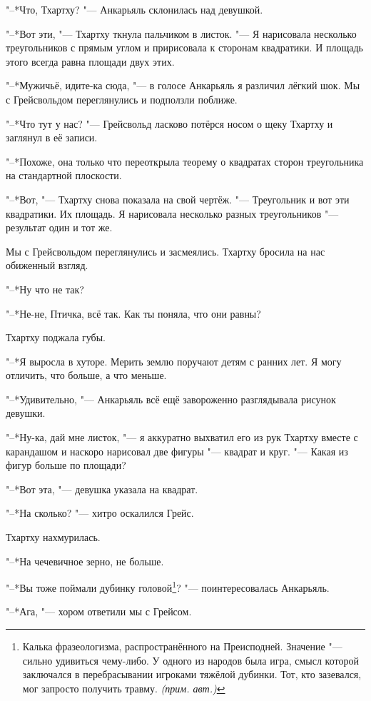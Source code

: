 \documentclass[a4paper,10pt,fleqn]{book}
\newcommand{\ldotst}{\so{...}\xspace}
\newcommand{\authornote}{\textit{(прим. авт.)}}
\begin{document}
"--*Что, Тхартху? "--- Анкарьяль склонилась над девушкой.

"--*Вот эти, "--- Тхартху ткнула пальчиком в листок.
"--- Я нарисовала несколько треугольников с\ldotst прямым углом и пририсовала к сторонам квадратики.
И площадь этого всегда равна площади двух этих.

"--*Мужичьё, идите-ка сюда, "--- в голосе Анкарьяль я различил лёгкий шок.
Мы с Грейсвольдом переглянулись и подползли поближе.

"--*Что тут у нас? "--- Грейсвольд ласково потёрся носом о щеку Тхартху и заглянул в её записи.

"--*Похоже, она только что переоткрыла теорему о квадратах сторон треугольника на стандартной плоскости.

"--*Вот, "--- Тхартху снова показала на свой чертёж.
"--- Треугольник и вот эти квадратики.
Их площадь.
Я нарисовала несколько разных треугольников "--- результат один и тот же.

Мы с Грейсвольдом переглянулись и засмеялись.
Тхартху бросила на нас обиженный взгляд.

"--*Ну что не так?

"--*Не-не, Птичка, всё так.
Как ты поняла, что они равны?

Тхартху поджала губы.

"--*Я выросла в хуторе.
Мерить землю поручают детям с ранних лет.
Я могу отличить, что больше, а что меньше.

"--*Удивительно, "--- Анкарьяль всё ещё завороженно разглядывала рисунок девушки.

"--*Ну-ка, дай мне листок, "--- я аккуратно выхватил его из рук Тхартху вместе с карандашом и наскоро нарисовал две фигуры "--- квадрат и круг.
"--- Какая из фигур больше по площади?

"--*Вот эта, "--- девушка указала на квадрат.

"--*На сколько? "--- хитро оскалился Грейс.

Тхартху нахмурилась.

"--*На чечевичное зерно, не больше.

"--*Вы тоже поймали дубинку головой\footnote
{Калька фразеологизма, распространённого на Преисподней.
Значение "--- сильно удивиться чему-либо.
У одного из народов была игра, смысл которой заключался в перебрасывании игроками тяжёлой дубинки.
Тот, кто зазевался, мог запросто получить травму. \authornote}? "--- поинтересовалась Анкарьяль.

"--*Ага, "--- хором ответили мы с Грейсом.
\end{document}
